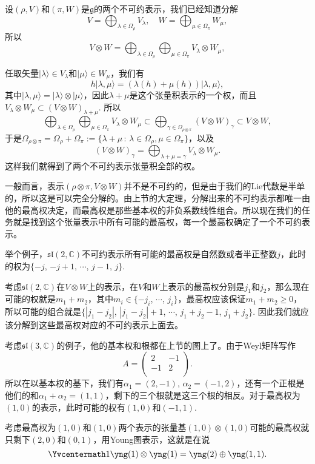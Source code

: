 \documentclass[9pt]{extarticle}
\newcommand{\cc}{\mathbb{C}}
\newcommand{\lag}{{\mathfrak{g}}}
\begin{document}
\para 设$(\rho,V)$和$(\pi,W)$是$\lag$的两个不可约表示，我们已经知道分解
\[
	V=\bigoplus_{\lambda\in\Omega_\rho} V_\lambda,\quad W=\bigoplus_{\mu\in\Omega_\pi} W_\mu,
\]
所以
\[
	V\otimes W=\bigoplus_{\lambda\in\Omega_\rho}\bigoplus_{\mu\in\Omega_\pi} V_\lambda\otimes W_\mu,
\]

任取矢量$|\lambda\rangle\in V_\lambda$和$|\mu\rangle\in W_\mu$，我们有
\[
	h|\lambda,\mu\rangle=(\lambda(h)+\mu(h))|\lambda,\mu\rangle,
\]
其中$|\lambda,\mu\rangle=|\lambda\rangle\otimes |\mu\rangle$，因此$\lambda+\mu$是这个张量积表示的一个权，而且$V_\lambda\otimes W_\mu \subset (V\otimes W)_{\lambda+\mu}$. 所以
\[
	\bigoplus_{\lambda\in\Omega_\rho}\bigoplus_{\mu\in\Omega_\pi} V_\lambda\otimes W_\mu\subset \bigoplus_{\gamma\in \Omega_{\rho\otimes\pi}} (V\otimes W)_{\gamma}\subset V\otimes W,
\]
于是$\Omega_{\rho\otimes\pi}=\Omega_{\rho}+\Omega_{\pi}:=\{\lambda+\mu\,:\,\lambda\in\Omega_\rho,\mu\in\Omega_\pi\}$，以及
\[
	(V\otimes W)_{\gamma}=\bigoplus_{\lambda+\mu=\gamma}V_\lambda\otimes W_\mu.
\]
这样我们就得到了两个不可约表示张量积全部的权。

\para 一般而言，表示$(\rho\otimes\pi,V\otimes W)$并不是不可约的，但是由于我们的Lie代数是半单的，所以这是可以完全分解的。由上节的大定理，分解出来的不可约表示都唯一由他的最高权决定，而最高权是那些基本权的非负系数线性组合。所以现在我们的任务就是找到这个张量表示中所有可能的最高权，每一个最高权确定了一个不可约表示。

\para 举个例子，$\mathfrak{sl}(2,\cc)$不可约表示所有可能的最高权是自然数或者半正整数$j$，此时的权为$\{-j$, $-j+1$, $\cdots$, $j-1$, $j\}$.

考虑$\mathfrak{sl}(2,\cc)$在$V\otimes W$上的表示，在$V$和$W$上表示的最高权分别是$j_1$和$j_2$，那么现在可能的权就是$m_1+m_2$，其中$m_i\in\{-j_i$, $\cdots$, $j_i\}$，最高权应该保证$m_1+m_2\geq 0$，所以可能的组合就是$\{|j_1-j_2|$, $|j_1-j_2|+1$, $\cdots$, $j_1+j_2-1$, $j_1+j_2\}$. 因此我们就应该分解到这些最高权对应的不可约表示上面去。

\para 考虑$\mathfrak{sl}(3,\cc)$的例子，他的基本权和根都在上节的图上了。由于Weyl矩阵写作
\[
	A=\begin{pmatrix}
	2&-1\\
	-1&2\\
	\end{pmatrix}.
\]
所以在以基本权的基下，我们有$\alpha_1=(2,-1)$, $\alpha_2=(-1,2)$，还有一个正根是他们的和$\alpha_1+\alpha_2=(1,1)$，剩下的三个根就是这三个根的相反。对于最高权为$(1,0)$的表示，此时可能的权有$(1,0)$和$(-1,1)$. 

考虑最高权为$(1,0)$和$(1,0)$两个表示的张量基$(1,0)\otimes (1,0)$可能的最高权就只剩下$(2,0)$和$(0,1)$，用Young图表示，这就是在说
\[
\Yvcentermath1
\yng(1)\otimes \yng(1)=\yng(2)\oplus\yng(1,1).
\]
\end{document}
